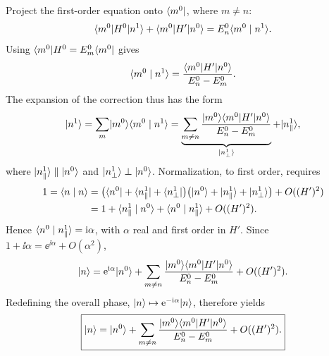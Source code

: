Project the first-order equation onto $\langle m^0\rvert$, where $m\ne n$:
\[
 \langle m^0\rvert H^0\lvert n^1\rangle+\langle m^0\rvert H'\lvert n^0\rangle
 =E_n^0\langle m^0\mid n^1\rangle.
\]
Using $\langle m^0\rvert H^0=E_m^0\langle m^0\rvert$ gives
\[
 \langle m^0\mid n^1\rangle=\frac{\langle m^0\rvert H'\lvert n^0\rangle}{E_n^0-E_m^0}.
\]
The expansion of the correction thus has the form
\[
 \lvert n^1\rangle=\sum_m\lvert m^0\rangle\langle m^0\mid n^1\rangle
 =\underbrace{\sum_{m\ne n}
 \frac{\lvert m^0\rangle\langle m^0\rvert H'\lvert n^0\rangle}{E_n^0-E_m^0}}_{\lvert n^1_\perp\rangle}
 +\lvert n^1_\parallel\rangle,
\]
where $\lvert n^1_\parallel\rangle\parallel\lvert n^0\rangle$ and
$\lvert n^1_\perp\rangle\perp\lvert n^0\rangle$.
Normalization, to first order, requires
\begin{align*}
 1=\langle n\mid n\rangle
 &=\bigl(\langle n^0\rvert+\langle n^1_\parallel\rvert+\langle n^1_\perp\rvert\bigr)
   \bigl(\lvert n^0\rangle+\lvert n^1_\parallel\rangle+\lvert n^1_\perp\rangle\bigr)
   +O((H')^2)\\
 &=1+\langle n^1_\parallel\mid n^0\rangle
     +\langle n^0\mid n^1_\parallel\rangle+O((H')^2).
\end{align*}
Hence $\langle n^0\mid n^1_\parallel\rangle=\mathrm{i}\alpha$, with $\alpha$ real and
first order in $H'$. Since $1+\ii\alpha=\ee^{\ii\alpha}+O(\alpha^2)$,
\[
 \lvert n\rangle=\mathrm{e}^{\mathrm{i}\alpha}\lvert n^0\rangle
 +\sum_{m\ne n}\frac{\lvert m^0\rangle\langle m^0\rvert H'\lvert n^0\rangle}{E_n^0-E_m^0}
 +O((H')^2).
\]
Redefining the overall phase, $\lvert n\rangle\mapsto\mathrm{e}^{-\mathrm{i}\alpha}\lvert n\rangle$,
therefore yields
\[
 \boxed{\lvert n\rangle=\lvert n^0\rangle
 +\sum_{m\ne n}\frac{\lvert m^0\rangle\langle m^0\rvert H'\lvert n^0\rangle}{E_n^0-E_m^0}
 +O((H')^2).}
\]
